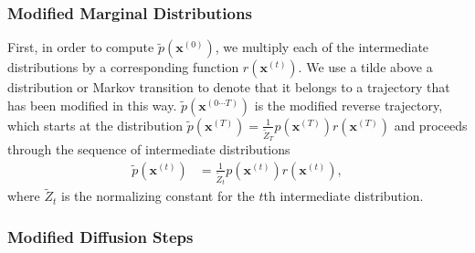 \documentclass{article}
\newcommand{\mb}{\mathbf}
\newcommand{\qtrajtil}{\tilde{p}\left( \mb x^{(0\cdots T)} \right)}
\newcommand{\qmarg}{p\left( \mb x^{(0)} \right)}
\begin{document}

\subsubsection{Modified Marginal Distributions}

First, in order to compute $\tilde{p}\left(\mb x^{(0)} \right)$, we multiply each of the intermediate distributions by a corresponding function $r
\left( \mb x^{(t)} \right)$. We use a tilde above a distribution or Markov transition to denote that it belongs to a trajectory that has been modified in this way.
$\qtrajtil$ is the modified reverse trajectory, which starts at the distribution $\tilde{p}\left( \mb x^{(T)} \right) = \frac{1}{\tilde{Z}_T} p\left( \mb x^{(T)} \right) r\left( \mb x^{(T)} \right)$ and proceeds through 
the sequence of intermediate distributions 
\begin{align}
\tilde{p} \left( \mb x^{(t)} \right) 
	& = 
\frac{1}{\tilde{Z}_t} p\left(\mb x^{(t)} \right) r\left( \mb x^{(t)} \right)
\label{eq perturb marginals}
,
\end{align}
where $\tilde{Z}_t$ is the normalizing constant for the $t$th intermediate distribution.

\subsubsection{Modified Diffusion Steps}
\end{document}

